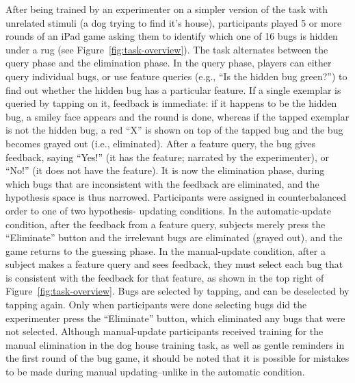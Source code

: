 \documentclass[10pt,letterpaper]{article}
\begin{document}
After being trained by an experimenter on a simpler version of the task with 
unrelated stimuli (a dog trying to find it's house), participants played 5 or more 
rounds of an iPad game asking them to identify which one of 16 bugs is hidden 
under a rug (see Figure~\ref{fig:task-overview}). The task alternates between the 
query phase and the elimination phase. In the query phase, players can either query 
individual bugs, or use feature queries (e.g., ``Is the hidden bug green?'') to find out 
whether the hidden bug has a particular feature. If a single exemplar is queried by 
tapping on it, feedback is immediate: if it happens to be the hidden bug, a smiley 
face appears and the round is done, whereas if the tapped exemplar is not the 
hidden bug, a red ``X'' is shown on top of the tapped bug and the bug becomes 
grayed out (i.e., eliminated). After a feature query, the bug gives feedback, saying 
``Yes!'' (it has the feature; narrated by the experimenter), or ``No!'' (it does not have 
the feature). It is now the elimination phase, during which bugs that are inconsistent 
with the feedback are eliminated, and the hypothesis space is thus narrowed. 
Participants were assigned in counterbalanced order to one of two hypothesis-
updating conditions. In the automatic-update condition, after the feedback from a 
feature query, subjects merely press the ``Eliminate'' button and the irrelevant bugs 
are eliminated (grayed out), and the game returns to the guessing phase. In the 
manual-update condition, after a subject makes a feature query and sees feedback, 
they must select each bug that is consistent with the feedback for that feature, as 
shown in the top right of Figure~\ref{fig:task-overview}. Bugs are selected by 
tapping, and can be deselected by tapping again. Only when participants were done 
selecting bugs did the experimenter press the ``Eliminate'' button, which eliminated 
any bugs that were not selected. Although manual-update participants received 
training for the manual elimination in the dog house training task, as well as gentle 
reminders in the first round of the bug game, it should be noted that it is possible for 
mistakes to be made during manual updating--unlike in the automatic condition.
\end{document}
